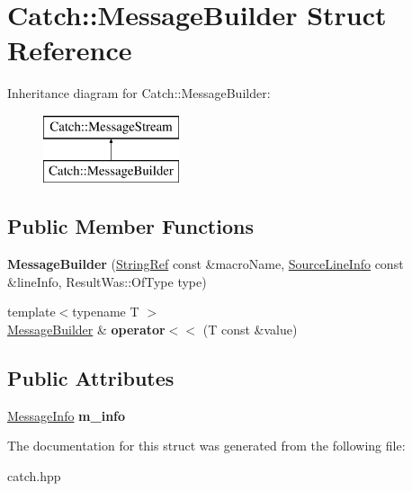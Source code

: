 \hypertarget{structCatch_1_1MessageBuilder}{}\section{Catch\+::Message\+Builder Struct Reference}
\label{structCatch_1_1MessageBuilder}
Inheritance diagram for Catch\+::Message\+Builder\+:\begin{figure}[H]
\begin{center}
\leavevmode
\includegraphics[height=2.000000cm]{structCatch_1_1MessageBuilder}
\end{center}
\end{figure}
\subsection*{Public Member Functions}
\begin{DoxyCompactItemize}
\item 
\mbox{\label{structCatch_1_1MessageBuilder_ac34832ca527a758f000ac233d32dd068}} 
{\bfseries Message\+Builder} (\mbox{\hyperlink{classCatch_1_1StringRef}{String\+Ref}} const \&macro\+Name, \mbox{\hyperlink{structCatch_1_1SourceLineInfo}{Source\+Line\+Info}} const \&line\+Info, Result\+Was\+::\+Of\+Type type)
\item 
\mbox{\label{structCatch_1_1MessageBuilder_a20fa48d069b20dddcc2d3df8abb123c1}} 
{\footnotesize template$<$typename T $>$ }\\\mbox{\hyperlink{structCatch_1_1MessageBuilder}{Message\+Builder}} \& {\bfseries operator$<$$<$} (T const \&value)
\end{DoxyCompactItemize}
\subsection*{Public Attributes}
\begin{DoxyCompactItemize}
\item 
\mbox{\label{structCatch_1_1MessageBuilder_a979f1c2b36d78f80ee275bfa5ba0209f}} 
\mbox{\hyperlink{structCatch_1_1MessageInfo}{Message\+Info}} {\bfseries m\+\_\+info}
\end{DoxyCompactItemize}


The documentation for this struct was generated from the following file\+:\begin{DoxyCompactItemize}
\item 
catch.\+hpp\end{DoxyCompactItemize}
